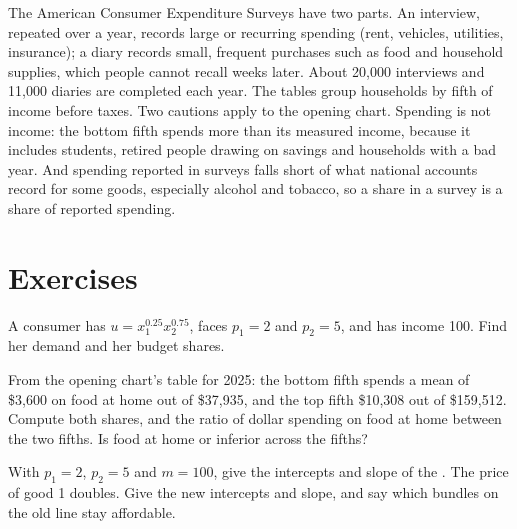 \begin{measure}
The American Consumer Expenditure Surveys have two parts. An interview,
repeated over a year, records large or recurring spending (rent, vehicles,
utilities, insurance); a diary records small, frequent purchases such as
food and household supplies, which people cannot recall weeks later.
About 20,000 interviews and 11,000 diaries are completed each
year. %
The tables group households by fifth of income before taxes. Two cautions
apply to the opening chart. Spending is not income: the bottom fifth spends
more than its measured income, because it includes students, retired people
drawing on savings and households with a bad year. And spending reported in
surveys falls short of what national accounts record for some goods,
especially alcohol and tobacco, so a share in a survey is a share of
reported spending.
\end{measure}

\section*{Exercises}\label{sec:b1:consumer-choice:exercises}

\begin{exercise}[$\star$]\label{exo:b1:consumer-choice:cd}
A consumer has $u = x_1^{0.25}x_2^{0.75}$, faces $p_1 = 2$ and $p_2 = 5$, and has
income 100. Find her demand and her budget shares.
\end{exercise}

\begin{exercise}[$\star$]\label{exo:b1:consumer-choice:read}
From the opening chart's table for 2025: the bottom fifth spends a mean of
\$3,600 on food at home out of \$37,935, and the top fifth \$10,308 out of
\$159,512. %
Compute both shares, and the ratio of dollar spending on food at home
between the two fifths. Is food at home  or inferior across the
fifths?
\end{exercise}

\begin{exercise}[$\star$]\label{exo:b1:consumer-choice:pivot}
With $p_1 = 2$, $p_2 = 5$ and $m = 100$, give the intercepts and slope of the
. The price of good 1 doubles. Give the new intercepts and
slope, and say which bundles on the old line stay affordable.
\end{exercise}

